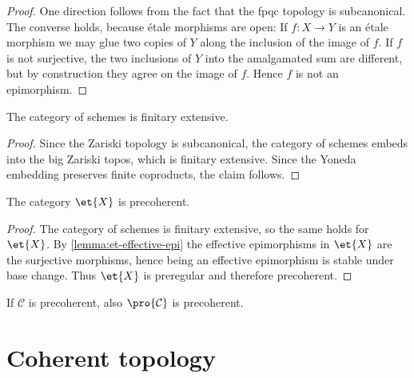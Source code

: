 \begin{proof}
    \leanok
    \mathlibok
    One direction follows from the fact that the fpqc topology is subcanonical. The converse
    holds, because étale morphisms are open: If $f\colon X \to Y$ is an étale morphism
    we may glue two copies of $Y$ along the inclusion of the image of $f$. If $f$ is not surjective,
    the two inclusions of $Y$ into the amalgamated sum are different, but by construction
    they agree on the image of $f$. Hence $f$ is not an epimorphism.
\end{proof}

\begin{lemma}
    The category of schemes is finitary extensive.
    \mathlibok
    \leanok
    \label{lemma:scheme-finitaryextensive}
\end{lemma}

\begin{proof}
    \leanok
    Since the Zariski topology is subcanonical, the category of schemes embeds
    into the big Zariski topos, which is finitary extensive. Since
    the Yoneda embedding preserves finite coproducts, the claim follows.
\end{proof}

\begin{lemma}
    The category $\et{X}$ is precoherent.
    \label{lemma:et-precoherent}
    \leanok
\end{lemma}

\begin{proof}
    \leanok
    The category of schemes is finitary extensive, so the same holds
    for $\et{X}$. By \ref{lemma:et-effective-epi} the effective epimorphisms
    in $\et{X}$ are the surjective morphisms, hence being an effective epimorphism
    is stable under base change. Thus $\et{X}$ is preregular and therefore precoherent.
\end{proof}

\begin{proposition}
    If $\mathcal{C}$ is precoherent, also $\pro{\mathcal{C}}$ is precoherent.
    \label{prop:pro-precoherent}
\end{proposition}

\section{Coherent topology}


